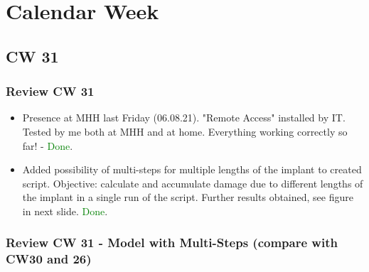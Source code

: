 \section{Calendar Week}
\subsection{CW 31}
\begin{frame}
  \frametitle{Review CW 31}
	\begin{itemize}
		\item Presence at MHH last Friday (06.08.21). "Remote Access" installed by IT. Tested by me both at MHH and at home. Everything working correctly so far! - \textcolor{green}{Done}.
		\item Added possibility of multi-steps for multiple lengths of the implant to created script. Objective: calculate and accumulate damage due to different lengths of the implant in a single run of the script. Further results obtained, see figure in next slide. \textcolor{green}{Done}.
	\end{itemize}
\end{frame}

\begin{frame}
  \frametitle{Review CW 31 - Model with Multi-Steps (compare with CW30 and 26)}
	\begin{figure}
	\end{figure}
\end{frame}

